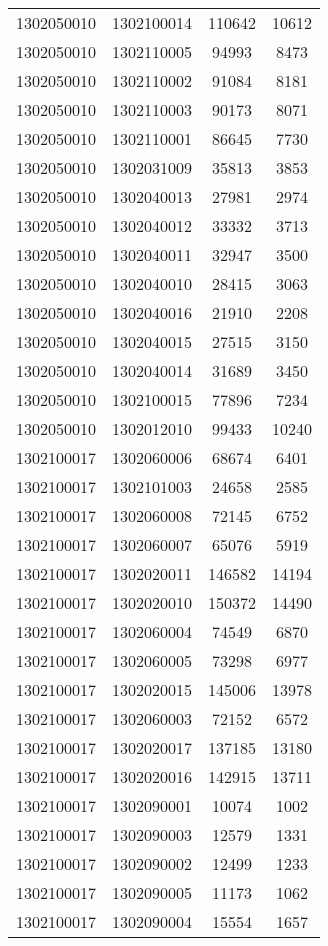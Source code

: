 \begin{longtable}[h]{llcc}
		1302050010 & 1302100014 & 110642 & 10612\\
		1302050010 & 1302110005 & 94993 & 8473\\
		1302050010 & 1302110002 & 91084 & 8181\\
		1302050010 & 1302110003 & 90173 & 8071\\
		1302050010 & 1302110001 & 86645 & 7730\\
		1302050010 & 1302031009 & 35813 & 3853\\
		1302050010 & 1302040013 & 27981 & 2974\\
		1302050010 & 1302040012 & 33332 & 3713\\
		1302050010 & 1302040011 & 32947 & 3500\\
		1302050010 & 1302040010 & 28415 & 3063\\
		1302050010 & 1302040016 & 21910 & 2208\\
		1302050010 & 1302040015 & 27515 & 3150\\
		1302050010 & 1302040014 & 31689 & 3450\\
		1302050010 & 1302100015 & 77896 & 7234\\
		1302050010 & 1302012010 & 99433 & 10240\\
		1302100017 & 1302060006 & 68674 & 6401\\
		1302100017 & 1302101003 & 24658 & 2585\\
		1302100017 & 1302060008 & 72145 & 6752\\
		1302100017 & 1302060007 & 65076 & 5919\\
		1302100017 & 1302020011 & 146582 & 14194\\
		1302100017 & 1302020010 & 150372 & 14490\\
		1302100017 & 1302060004 & 74549 & 6870\\
		1302100017 & 1302060005 & 73298 & 6977\\
		1302100017 & 1302020015 & 145006 & 13978\\
		1302100017 & 1302060003 & 72152 & 6572\\
		1302100017 & 1302020017 & 137185 & 13180\\
		1302100017 & 1302020016 & 142915 & 13711\\
		1302100017 & 1302090001 & 10074 & 1002\\
		1302100017 & 1302090003 & 12579 & 1331\\
		1302100017 & 1302090002 & 12499 & 1233\\
		1302100017 & 1302090005 & 11173 & 1062\\
		1302100017 & 1302090004 & 15554 & 1657\\

\end{longtable}
